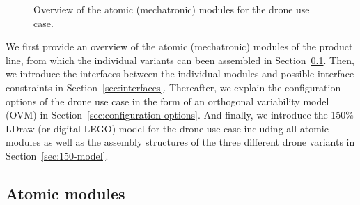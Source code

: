 \documentclass[sigconf,review]{acmart}
\begin{document}
\begin{figure}[tbp]
    
    \hfill
    \hfill
    \hfill

    \caption{Overview of the atomic (mechatronic) modules for the drone use case.}
    \label{fig:atomic-modules}
\end{figure}


We first provide an overview of the atomic (mechatronic) modules of the product line, from which the individual variants can been assembled in Section~\ref{sec:atomic-modules}.
Then, we introduce the interfaces between the individual modules and possible interface constraints in Section~\ref{sec:interfaces}.
Thereafter, we explain the configuration options of the drone use case in the form of an orthogonal variability model (OVM) in Section~\ref{sec:configuration-options}.
And finally, we introduce the 150\% LDraw (or digital LEGO) model for the drone use case including all atomic modules as well as the assembly structures of the three different drone variants in Section~\ref{sec:150-model}.

\subsection{Atomic modules}
\label{sec:atomic-modules}
\end{document}
